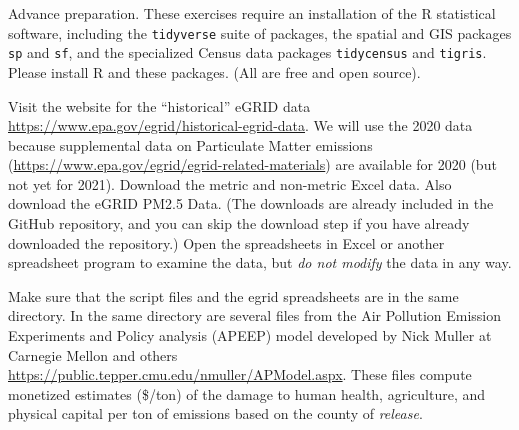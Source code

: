 \documentclass[fleqn, 12pt]{exam}
\begin{document}
  \begin{questions}
    
  \question Advance preparation. These exercises require an installation of the R statistical software, including the \texttt{tidyverse} suite of packages, the spatial and GIS packages \texttt{sp} and \texttt{sf}, and the specialized Census data packages \texttt{tidycensus} and \texttt{tigris}.  Please install R and these packages. (All are free and open source).

\question Visit the website for the ``historical'' eGRID data \url{https://www.epa.gov/egrid/historical-egrid-data}.  We will use the 2020 data because supplemental data on Particulate Matter emissions (\url{https://www.epa.gov/egrid/egrid-related-materials}) are available for 2020 (but not yet for 2021).  Download the metric and non-metric Excel data.  Also download the eGRID PM2.5 Data.  (The downloads are already included in the GitHub repository, and you can skip the download step if you have already downloaded the repository.) Open the spreadsheets in Excel or another spreadsheet program to examine the data, but \emph{do not modify} the data in any way.

    
  \question Make sure that the script files and the egrid spreadsheets are in the same directory. In the same directory are several files from the Air Pollution Emission Experiments and Policy analysis (APEEP) model developed by Nick Muller at Carnegie Mellon and others  \url{https://public.tepper.cmu.edu/nmuller/APModel.aspx}. These files compute monetized estimates (\$/ton) of the damage to human health, agriculture, and physical capital per ton of emissions based on the county of \emph{release}.


\end{questions}
\end{document}
